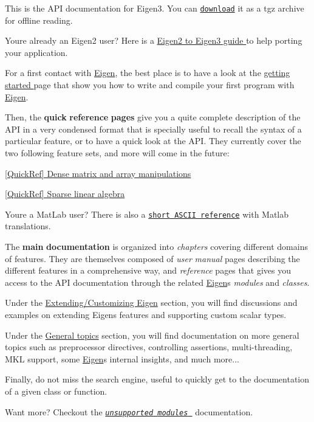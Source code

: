 This is the A\+PI documentation for Eigen3. You can \href{eigen-doc.tgz}{\tt download} it as a tgz archive for offline reading.

You\textquotesingle{}re already an Eigen2 user? Here is a \hyperlink{_eigen2_to_eigen3}{Eigen2 to Eigen3 guide } to help porting your application.

For a first contact with \hyperlink{namespace_eigen}{Eigen}, the best place is to have a look at the \hyperlink{_getting_started}{getting started } page that show you how to write and compile your first program with \hyperlink{namespace_eigen}{Eigen}.

Then, the {\bfseries quick} {\bfseries reference} {\bfseries pages} give you a quite complete description of the A\+PI in a very condensed format that is specially useful to recall the syntax of a particular feature, or to have a quick look at the A\+PI. They currently cover the two following feature sets, and more will come in the future\+:
\begin{DoxyItemize}
\item \hyperlink{group___quick_ref_page}{\mbox{[}Quick\+Ref\mbox{]} Dense matrix and array manipulations }
\item \hyperlink{group___sparse_quick_ref_page}{\mbox{[}Quick\+Ref\mbox{]} Sparse linear algebra }
\end{DoxyItemize}

You\textquotesingle{}re a Mat\+Lab user? There is also a \href{AsciiQuickReference.txt}{\tt short A\+S\+C\+II reference} with Matlab translations.

The {\bfseries main} {\bfseries documentation} is organized into {\itshape chapters} covering different domains of features. They are themselves composed of {\itshape user} {\itshape manual} pages describing the different features in a comprehensive way, and {\itshape reference} pages that gives you access to the A\+PI documentation through the related \hyperlink{namespace_eigen}{Eigen}\textquotesingle{}s {\itshape modules} and {\itshape classes}.

Under the \hyperlink{UserManual_CustomizingEigen}{Extending/\+Customizing Eigen} section, you will find discussions and examples on extending Eigen\textquotesingle{}s features and supporting custom scalar types.

Under the \hyperlink{UserManual_Generalities}{General topics} section, you will find documentation on more general topics such as preprocessor directives, controlling assertions, multi-\/threading, M\+KL support, some \hyperlink{namespace_eigen}{Eigen}\textquotesingle{}s internal insights, and much more...

Finally, do not miss the search engine, useful to quickly get to the documentation of a given class or function.

Want more? Checkout the \href{unsupported/index.html}{\tt {\itshape unsupported} {\itshape modules} } documentation. 